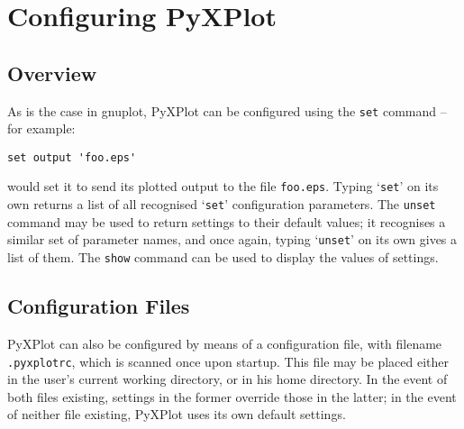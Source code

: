 %
%
%
%
%



\chapter{Configuring PyXPlot}

\section{Overview}

\label{configuration}

As is the case in gnuplot, PyXPlot can be configured using the \noindent
\texttt{set} command -- for example:

\begin{verbatim}set output 'foo.eps'\end{verbatim}

\noindent would set it to send its plotted output to the file
\texttt{foo.eps}.  Typing `\texttt{set}' on its own returns a list of all
recognised `\texttt{set}' configuration parameters. The \texttt{unset} command
may be used to return settings to their default values; it recognises a similar
set of parameter names, and once again, typing `\texttt{unset}' on its own
gives a list of them. The \texttt{show} command can be used to display the
values of settings.

\section{Configuration Files}
\label{config_files}

PyXPlot can also be configured by means of a configuration file, with filename
\texttt{.pyxplotrc}, which is scanned once upon startup. This file may be
placed either in the user's current working directory, or in his home
directory. In the event of both files existing, settings in the former override
those in the latter; in the event of neither file existing, PyXPlot uses its
own default settings.

